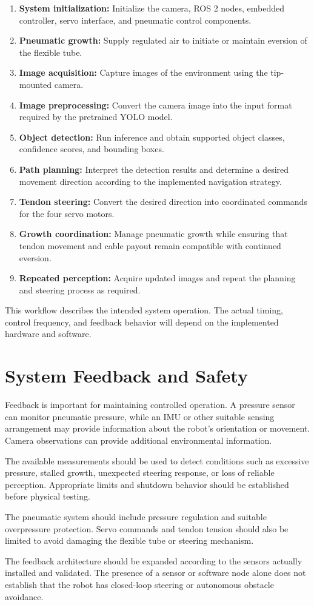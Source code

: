 \begin{enumerate}
    \item \textbf{System initialization:} Initialize the camera, ROS 2 nodes, embedded controller, servo interface, and pneumatic control components.
    \item \textbf{Pneumatic growth:} Supply regulated air to initiate or maintain eversion of the flexible tube.
    \item \textbf{Image acquisition:} Capture images of the environment using the tip-mounted camera.
    \item \textbf{Image preprocessing:} Convert the camera image into the input format required by the pretrained YOLO model.
    \item \textbf{Object detection:} Run inference and obtain supported object classes, confidence scores, and bounding boxes.
    \item \textbf{Path planning:} Interpret the detection results and determine a desired movement direction according to the implemented navigation strategy.
    \item \textbf{Tendon steering:} Convert the desired direction into coordinated commands for the four servo motors.
    \item \textbf{Growth coordination:} Manage pneumatic growth while ensuring that tendon movement and cable payout remain compatible with continued eversion.
    \item \textbf{Repeated perception:} Acquire updated images and repeat the planning and steering process as required.
\end{enumerate}

This workflow describes the intended system operation. The actual timing, control frequency, and feedback behavior will depend on the implemented hardware and software.

\section{System Feedback and Safety}

Feedback is important for maintaining controlled operation. A pressure sensor can monitor pneumatic pressure, while an IMU or other suitable sensing arrangement may provide information about the robot's orientation or movement. Camera observations can provide additional environmental information.

The available measurements should be used to detect conditions such as excessive pressure, stalled growth, unexpected steering response, or loss of reliable perception. Appropriate limits and shutdown behavior should be established before physical testing.

The pneumatic system should include pressure regulation and suitable overpressure protection. Servo commands and tendon tension should also be limited to avoid damaging the flexible tube or steering mechanism.

The feedback architecture should be expanded according to the sensors actually installed and validated. The presence of a sensor or software node alone does not establish that the robot has closed-loop steering or autonomous obstacle avoidance.